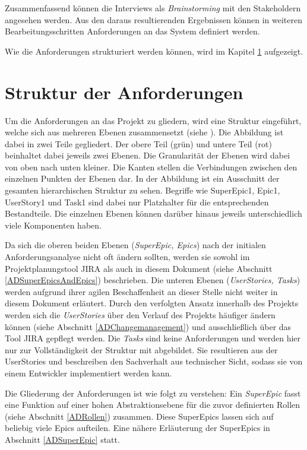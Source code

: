 Zusammenfassend können die Interviews als \textit{Brainstorming} mit den Stakeholdern angesehen werden. Aus den daraus resultierenden Ergebnissen können in weiteren Bearbeitungsschritten Anforderungen an das System definiert werden.

Wie die Anforderungen strukturiert werden können, wird im Kapitel \ref{ADStruktur} aufgezeigt.


\section{Struktur der Anforderungen}\label{ADStruktur}
Um die Anforderungen an das Projekt zu gliedern, wird eine Struktur eingeführt, welche sich aus mehreren Ebenen zusammensetzt (siehe ). Die Abbildung ist dabei in zwei Teile gegliedert. Der obere Teil (grün) und untere Teil (rot) beinhaltet dabei jeweils zwei Ebenen. Die Granularität der Ebenen wird dabei von oben nach unten kleiner. Die Kanten stellen die Verbindungen zwischen den einzelnen Punkten der Ebenen dar. In der Abbildung ist ein Ausschnitt der gesamten hierarchischen Struktur zu sehen. Begriffe wie SuperEpic1, Epic1, UserStory1 und Task1 sind dabei nur Platzhalter für die entsprechenden Bestandteile. Die einzelnen Ebenen können darüber hinaus jeweils unterschiedlich viele Komponenten haben.

Da sich die oberen beiden Ebenen (\textit{SuperEpic, Epics}) nach der initialen Anforderungsanalyse nicht oft ändern sollten, werden sie sowohl im Projektplanungstool JIRA als auch in diesem Dokument (siehe Abschnitt \ref{ADSuperEpicsAndEpics}) beschrieben. Die unteren Ebenen (\textit{UserStories, Tasks}) werden aufgrund ihrer agilen Beschaffenheit an dieser Stelle nicht weiter in diesem Dokument erläutert. Durch den verfolgten Ansatz innerhalb des Projekts werden sich die \textit{UserStories} über den Verlauf des Projekts häufiger ändern können (siehe Abschnitt \ref{ADChangemanagement}) und ausschließlich über das Tool JIRA gepflegt werden. Die \textit{Tasks} sind keine Anforderungen und werden hier nur zur Vollständigkeit der Struktur mit abgebildet. Sie resultieren aus der UserStories und beschreiben den Sachverhalt aus technischer Sicht, sodass sie von einem Entwickler implementiert werden kann.

Die Gliederung der Anforderungen ist wie folgt zu verstehen: Ein \textit{SuperEpic} fasst eine Funktion auf einer hohen Abstraktionsebene für die zuvor definierten Rollen (siehe Abschnitt \ref{ADRollen}) zusammen. Diese SuperEpics lassen sich auf beliebig viele Epics aufteilen. Eine nähere Erläuterung der SuperEpics in Abschnitt \ref{ADSuperEpic} statt.

